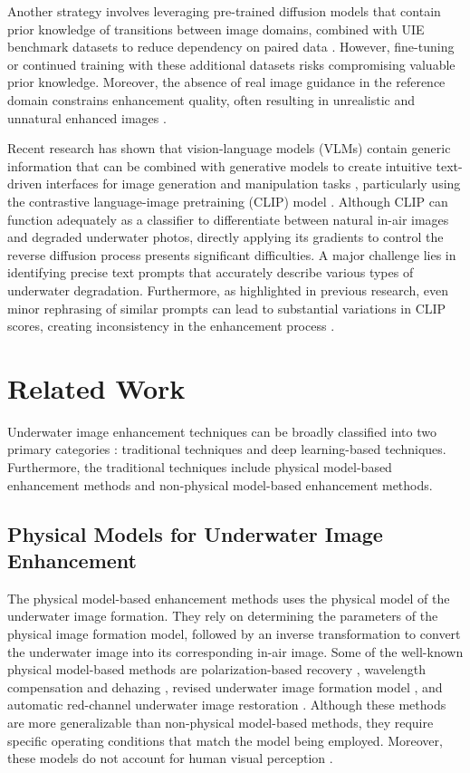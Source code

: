 \documentclass[3p,12pt,authoryear]{elsarticle}
\begin{document}
Another strategy involves leveraging pre-trained diffusion models that contain prior knowledge of transitions between image domains, combined with UIE benchmark datasets to reduce dependency on paired data \cite{DU2025125271}. However, fine-tuning or continued training with these additional datasets risks compromising valuable prior knowledge. Moreover, the absence of real image guidance in the reference domain constrains enhancement quality, often resulting in unrealistic and unnatural enhanced images \cite{10377881}.

Recent research has shown that vision-language models (VLMs) \cite{bordes2024introductionvisionlanguagemodeling, 10445007, ghosh2024exploringfrontiervisionlanguagemodels} contain generic information that can be combined with generative models to create intuitive text-driven interfaces for image generation and manipulation tasks \cite{10.1145/3528223.3530164}, particularly using the contrastive language-image pretraining (CLIP) model  \cite{pmlr-v139-radford21a}. Although CLIP can function adequately as a classifier to differentiate between natural in-air images and degraded underwater photos, directly applying its gradients to control the reverse diffusion process presents significant difficulties. A major challenge lies in identifying precise text prompts that accurately describe various types of underwater degradation. Furthermore, as highlighted in previous research, even minor rephrasing of similar prompts can lead to substantial variations in CLIP scores, creating inconsistency in the enhancement process \cite{Liang2023IterativePL}.

\section{Related Work}

Underwater image enhancement techniques can be broadly classified into two primary categories \cite{jmse10020241}: traditional techniques and deep learning-based techniques. Furthermore, the traditional techniques include physical model-based enhancement methods and non-physical model-based enhancement methods.

\subsection{Physical Models for Underwater Image Enhancement}
The physical model-based enhancement methods uses the physical model of the underwater image formation. They rely on determining the parameters of the physical image formation model, followed by an inverse transformation to convert the underwater image into its corresponding in-air image. 
Some of the well-known physical model-based methods are polarization-based recovery \cite{10.1109/TPAMI.2005.79}, wavelength compensation and dehazing \cite{6104148}, revised underwater image formation model \cite{8578801}, and automatic red-channel underwater image restoration \cite{GALDRAN2015132}. Although these methods are more generalizable than non-physical model-based methods, they require specific operating conditions that match the model being employed. Moreover, these models do not account for human visual perception \cite{10129222}.
\end{document}
